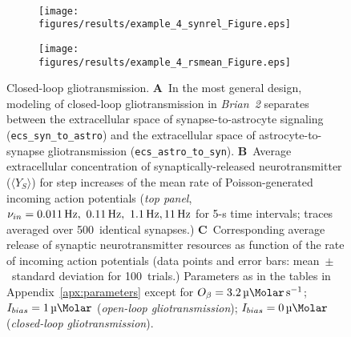 \documentclass[a4paper, 11pt]{article}
\newcommand{\brian}{\emph{Brian~2}\xspace}
\newcommand{\tave}[1]{\ensuremath{\langle#1\rangle}}
\newcommand*{\appref}[1]{Appendix~\ref{#1}}
\begin{document}
\begin{figure}
\begin{subfigure}[!t]{\textwidth}
\end{subfigure}\\[2.0ex]
\begin{subfigure}[t]{0.49\textwidth}
	\caption{}
	\centering
	\texttt{[image: figures/results/example\_4\_synrel\_Figure.eps]}
\end{subfigure}
\begin{subfigure}[t]{0.49\textwidth}
	\caption{}
	\centering
	\texttt{[image: figures/results/example\_4\_rsmean\_Figure.eps]}
\end{subfigure}
\caption{Closed-loop gliotransmission.
\textbf{A}~In the most general design, modeling of closed-loop gliotransmission in \brian separates between the extracellular space of synapse-to-astrocyte signaling (\lstinline|ecs_syn_to_astro|) and the extracellular space of astrocyte-to-synapse gliotransmission (\lstinline|ecs_astro_to_syn|).
\textbf{B}~Average extracellular concentration of synaptically-released neurotransmitter ($\tave{Y_S}$) for step increases of the mean rate of Poisson-generated incoming action potentials (\textit{top panel}, $\nu_{in}=\SIlist[list-final-separator={, }]{0.011;0.11;1.1;11}{\hertz}$ for 5-s time intervals; traces averaged over 500~identical synapses.)
\textbf{C}~Corresponding average release of synaptic neurotransmitter resources as function of the rate of incoming action potentials (data points and error bars: mean~$\pm$~standard deviation for 100~trials.)
Parameters as in the tables in \appref{apx:parameters} except for $O_\beta=\SI{3.2}{\micro \Molar.s^{-1}}$; $I_{bias}=\SI{1}{\micro \Molar}$ (\textit{open-loop gliotransmission}); $I_{bias}=\SI{0}{\micro \Molar}$ (\textit{closed-loop gliotransmission}).}
\label{Fig:astro_syn_interaction}
\end{figure}
\end{document}
